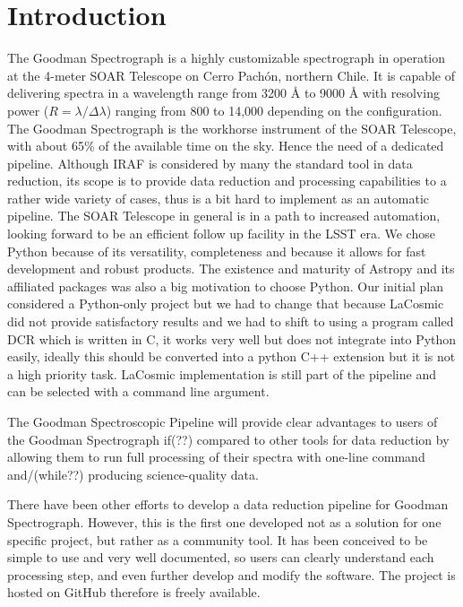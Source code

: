 \documentclass[11pt,twoside]{article}
\begin{document}
\section{Introduction}

The Goodman Spectrograph \citep{2004SPIE.5492..331C} is a highly customizable spectrograph in operation at
the 4-meter SOAR Telescope on Cerro Pach\'on, northern Chile.
It is capable of delivering spectra in a wavelength range from 3200 \AA{} to 9000 \AA{}
with resolving power ($R=\lambda/\Delta\lambda$) ranging from 800 to 14,000
depending on the configuration. The Goodman Spectrograph is the workhorse
instrument of the SOAR Telescope, with about 65\% of the available time on the sky.
Hence the need of a dedicated pipeline. Although IRAF is considered by many the standard tool
in data reduction, its scope is to provide data reduction and processing
capabilities to a rather wide variety of cases, thus is a bit hard to implement
as an automatic pipeline. The SOAR Telescope in general is in a path to increased automation, looking forward to be
an efficient follow up facility in the LSST era. We chose Python because of its
versatility, completeness and because it allows for fast development and
robust products. The existence and maturity of Astropy and its affiliated
packages was also a big motivation to choose Python.
Our initial plan considered a Python-only project but we had to change that
because LaCosmic \citep{2001PASP..113.1420V} did not provide satisfactory results and we had to shift
to using a program called DCR \citep{2004PASP..116..148P} which is written in C,
it works very well but does not integrate into Python easily, ideally this
should be converted into a python C++ extension but it is not a high priority
task.
LaCosmic implementation is still part of the pipeline and can be selected with a command
line argument.


The Goodman Spectroscopic Pipeline will provide clear advantages to users of the
Goodman Spectrograph if(??) compared to other tools for data reduction by allowing
them to run full processing of their spectra with one-line command and/(while??) producing
science-quality data.

There have been other efforts to develop a data reduction pipeline for Goodman
Spectrograph. However, this is the first one developed not as a solution for one
specific project, but rather as a community tool. It has been conceived to be
simple to use and very well documented, so users can clearly understand each
processing step, and even further develop and modify the software.
The project is hosted on GitHub therefore is freely available.
\end{document}
